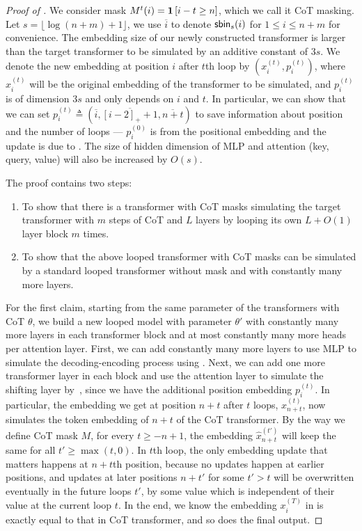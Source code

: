 \begin{proof}[Proof of ]

We consider mask $M^t(i) = \bm{1}\left[i-t\ge n\right]$, which we call it CoT masking. Let $s = \lfloor \log (n+m) +1 \rfloor$, we use $\overline i$ to denote $\mathsf{sbin}_s(i)$ for $1\le i\le n+m$ for convenience. The embedding size of our newly constructed transformer is larger than the target transformer to be simulated by an additive constant of $3s$. We denote the new embedding at position $i$ after $t$th loop by $(x_i^{(t)}, p_i^{(t)})$, where $x_i^{(t)}$ will be the original embedding of the transformer to be simulated, and $p_i^{(t)}$ is of dimension $3s$ and only depends on $i$ and $t$. In particular, we can show that we can set $p_i^{(t)} \triangleq (\overline i,\overline{[i-2]_+ +1}, \overline{n+t})$ to save information about position and the number of loops --- $p_i^{(0)}$ is from the positional embedding and the update is due to . The size of hidden dimension of MLP and attention (key, query, value) will also be increased by $O(s)$.

The proof contains two steps:
\begin{enumerate}
    \item To show that there is a transformer with CoT masks simulating the target transformer with $m$ steps of CoT and $L$ layers by looping its own $L+O(1)$ layer block $m$ times.
    \item To show that the above looped transformer with CoT masks can be simulated by a standard looped transformer without mask and with constantly many more layers.
\end{enumerate}

For the first claim, starting from the same parameter of the transformers with CoT $\theta$, we build a new looped model with parameter $\theta'$ with constantly many more layers in each transformer block and at most constantly many more heads per attention layer. First, we can add constantly many more layers to use MLP to simulate the decoding-encoding process using .
Next, we can add one more transformer layer in each block and use the attention layer to simulate the shifting layer by~, since we have the additional position embedding $p_i^(t)$.
In particular, the embedding we get at position $n+t$ after $t$ loops, $x_{n+t}^{(t)}$,  now simulates the token embedding of $n+t$ of the CoT transformer.
By the way we define CoT mask $M$, for every $t\ge -n+1$, the embedding $\hat{x}_{n+t}^{(t')}$ will keep the same for all $t'\ge \max(t,0)$. 
In $t$th loop, the only embedding update that matters happens at $n+t$th position, because no updates happen at earlier positions, and updates at later positions $n+t'$ for some $t'>t$ will be overwritten eventually in the future loops $t'$, by some value which is independent of their value at the current loop $t$. In the end, we know the embedding $x_i^{(T)}$ in  is exactly equal to that in CoT transformer, and so does the final output.


\end{proof}
